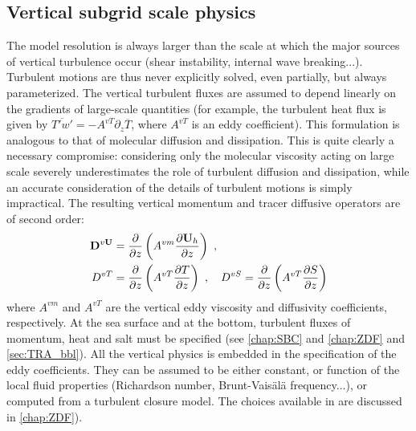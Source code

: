 \documentclass[../main/NEMO_manual]{subfiles}
\begin{document}
\subsection{Vertical subgrid scale physics}
\label{subsec:PE_zdf}

The model resolution is always larger than the scale at which the major sources of vertical turbulence occur
(shear instability, internal wave breaking...).
Turbulent motions are thus never explicitly solved, even partially, but always parameterized.
The vertical turbulent fluxes are assumed to depend linearly on the gradients of large-scale quantities
(for example, the turbulent heat flux is given by $\overline{T'w'}=-A^{vT} \partial_z \overline T$,
where $A^{vT}$ is an eddy coefficient).
This formulation is analogous to that of molecular diffusion and dissipation.
This is quite clearly a necessary compromise: considering only the molecular viscosity acting on
large scale severely underestimates the role of turbulent diffusion and dissipation,
while an accurate consideration of the details of turbulent motions is simply impractical.
The resulting vertical momentum and tracer diffusive operators are of second order:
\begin{equation}
  \label{eq:PE_zdf}
  \begin{split}
    {\ensuremath{\mathbf{D}}}^{v \mathbf{U}} &=\frac{\partial }{\partial z}\left( {A^{vm}\frac{\partial {\ensuremath{\mathbf{U}}}_h }{\partial z}} \right) \ , \\
    D^{vT}                         &= \frac{\partial }{\partial z}\left( {A^{vT}\frac{\partial T}{\partial z}} \right) \ ,
    \quad
    D^{vS}=\frac{\partial }{\partial z}\left( {A^{vT}\frac{\partial S}{\partial z}} \right)
  \end{split}
\end{equation}
where $A^{vm}$ and $A^{vT}$ are the vertical eddy viscosity and diffusivity coefficients, respectively.
At the sea surface and at the bottom, turbulent fluxes of momentum, heat and salt must be specified
(see \autoref{chap:SBC} and \autoref{chap:ZDF} and \autoref{sec:TRA_bbl}).
All the vertical physics is embedded in the specification of the eddy coefficients.
They can be assumed to be either constant, or function of the local fluid properties
(\eg Richardson number, Brunt-Vais\"{a}l\"{a} frequency...),
or computed from a turbulent closure model.
The choices available in \NEMO are discussed in \autoref{chap:ZDF}).

\end{document}
